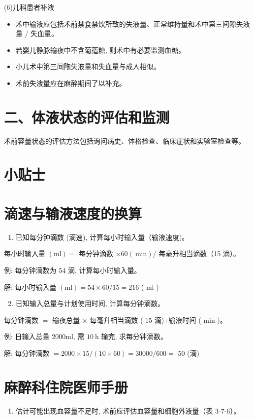 \documentclass[10pt]{article}
\begin{document}
(6)儿科患者补液

\begin{itemize}
  \item 术中输液应包括术前禁食禁饮所致的失液量、正常维持量和术中第三间隙失液量 / 失血量。
  \item 若婴儿静脉输夜中不含葡䔏糖, 则术中有必要监测血糖。
  \item 小儿术中第三间陁失液量和失血量与成人相似。
  \item 术前失液量应在麻醉期间了以补充。
\end{itemize}

\section*{二、体液状态的评估和监测}
术前容量状态的评估方法包括询问病史、体格检查、临床症状和实验室检查等。

\section*{小贴士}
\section*{滴速与输液速度的换算}
\begin{enumerate}
  \item 已知每分钟滴数 (滴速), 计算每小时输入量（输液速度)。
\end{enumerate}

每小时输入量 $(\mathrm{ml})=$ 每分钟滴数 $\times 60(\mathrm{~min}) /$ 每毫升相当滴数（15 滴）。

例: 每分钟滴数为 54 滴, 计算每小时输入量。

解: 每小时输入量 $(\mathrm{ml})=54 \times 60 / 15=216$ ( $\mathrm{ml}$ )

\begin{enumerate}
  \setcounter{enumi}{1}
  \item 已知输入总量与计划使用时间, 计算每分钟滴数。
\end{enumerate}

每分钟滴数 $=$ 输夜总量 $\times$ 每毫升相当滴数 ( 15 滴)।输液时间 ( $\mathrm{min}$ )。

例: 日输入总量 $2000 \mathrm{ml}$, 需 $10 \mathrm{~h}$ 输完, 求每分钟滴数。

解: 每分钟滴数 $=2000 \times 15 /(10 \times 60)=30000 / 600=$ 50 (滴)

\section*{麻醉科住院医师手册}
\begin{enumerate}
  \item 估计可能出现血容量不足时, 术前应评估血容量和细胞外液量（表 3-7-6）。
\end{enumerate}
\end{document}
